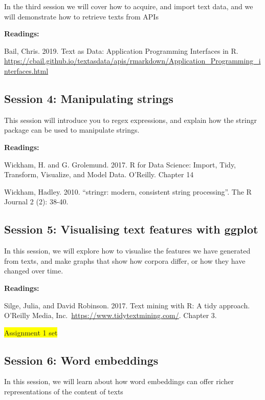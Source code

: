 \documentclass[
]{article}
\begin{document}
In the third session we will cover how to acquire, and import text data,
and we will demonstrate how to retrieve texts from APIs

\textbf{Readings:}

Bail, Chris. 2019. Text as Data: Application Programming Interfaces in
R.
\url{https://cbail.github.io/textasdata/apis/rmarkdown/Application_Programming_interfaces.html}

\hypertarget{session-4-manipulating-strings}{%
\subsection{Session 4: Manipulating
strings}\label{session-4-manipulating-strings}}

This session will introduce you to regex expressions, and explain how
the stringr package can be used to manipulate strings.

\textbf{Readings:}

Wickham, H. and G. Grolemund. 2017. R for Data Science: Import, Tidy,
Transform, Visualize, and Model Data. O'Reilly. Chapter 14

Wickham, Hadley. 2010. ``stringr: modern, consistent string
processing''. The R Journal 2 (2): 38-40.

\hypertarget{session-5-visualising-text-features-with-ggplot}{%
\subsection{Session 5: Visualising text features with
ggplot}\label{session-5-visualising-text-features-with-ggplot}}

In this session, we will explore how to visualise the features we have
generated from texts, and make graphs that show how corpora differ, or
how they have changed over time.

\textbf{Readings:}

Silge, Julia, and David Robinson. 2017. Text mining with R: A tidy
approach. O'Reilly Media, Inc.~\url{https://www.tidytextmining.com/}.
Chapter 3.

\colorbox{yellow}{Assignment 1 set}

\hypertarget{session-6-word-embeddings}{%
\subsection{Session 6: Word
embeddings}\label{session-6-word-embeddings}}

In this session, we will learn about how word embeddings can offer
richer representations of the content of texts
\end{document}
